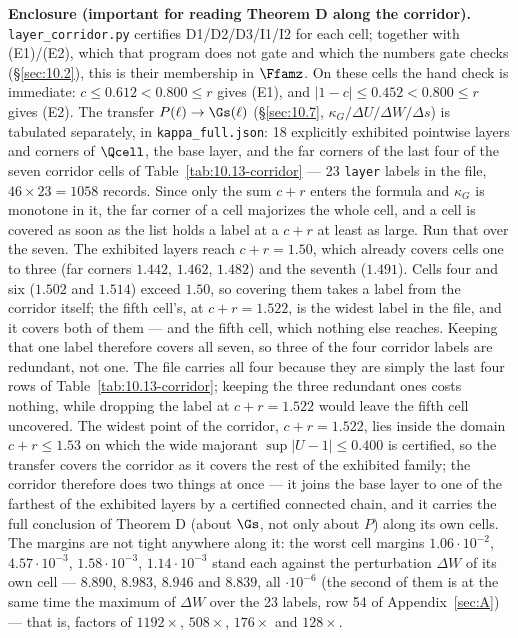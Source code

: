 \textbf{Enclosure (important for reading Theorem D along the corridor).}
\texttt{layer\_\allowbreak corridor.py} certifies D1/D2/D3/I1/I2 for each cell; together with
(E1)/(E2), which that program does not gate and which the numbers gate checks
(\S\ref{sec:10.2}), this is their membership in $\Ffamz$. On these cells the hand check is
immediate: $c \le 0.612 < 0.800 \le r$ gives (E1), and $|1-c| \le 0.452 < 0.800 \le r$ gives (E2). The transfer $P(\ell)\to\Gs(\ell)$ (\S\ref{sec:10.7}, $\kappa_G/\Delta U/\Delta W/\Delta s$) is tabulated separately, in \texttt{kappa\_\allowbreak full.json}: 18 explicitly exhibited pointwise layers and corners of $\Qcell$, the base layer, and the far corners of the last four of the seven corridor cells of Table~\ref{tab:10.13-corridor} --- 23 \texttt{layer} labels in the file, $46\times 23 = 1058$ records.
Since only the sum $c+r$ enters the formula and $\kappa_G$ is monotone in it, the far corner of a cell majorizes the whole cell, and a cell is covered as soon as the list holds a label at a $c+r$ at least as large. Run that over the seven. The exhibited layers reach $c+r = 1.50$, which already covers cells one to three (far corners $1.442$, $1.462$, $1.482$) and the seventh ($1.491$). Cells four and six ($1.502$ and $1.514$) exceed $1.50$, so covering them takes a label from the corridor itself; the fifth cell's, at $c+r = 1.522$, is the widest label in the file, and it covers both of them --- and the fifth cell, which nothing else reaches. Keeping that one label therefore covers all seven, so three of the four corridor labels are redundant, not one. The file carries all four because they are simply the last four rows of Table~\ref{tab:10.13-corridor}; keeping the three redundant ones costs nothing, while dropping the label at $c+r = 1.522$ would leave the fifth cell uncovered. The widest point of the corridor, $c+r=1.522$, lies inside the domain $c+r\leq 1.53$ on which the wide majorant $\sup|U-1|\leq 0.400$ is certified, so the transfer covers the corridor as it covers the rest of the exhibited family; the corridor therefore does two things at once --- it joins the base layer to one of the farthest of the exhibited layers by a certified connected chain, and it carries the full conclusion of Theorem D (about $\Gs$, not only about $P$) along its own cells. The margins are not tight anywhere along it: the worst cell margins $1.06\cdot 10^{-2}$, $4.57\cdot 10^{-3}$, $1.58\cdot 10^{-3}$, $1.14\cdot 10^{-3}$ stand each against the perturbation $\Delta W$ of its own cell --- $8.890$, $8.983$, $8.946$ and $8.839$, all $\cdot 10^{-6}$ (the second of them is at the same time the maximum of $\Delta W$ over the 23 labels, row 54 of Appendix~\ref{sec:A}) --- that is, factors of $1192\times$, $508\times$, $176\times$ and $128\times$.

